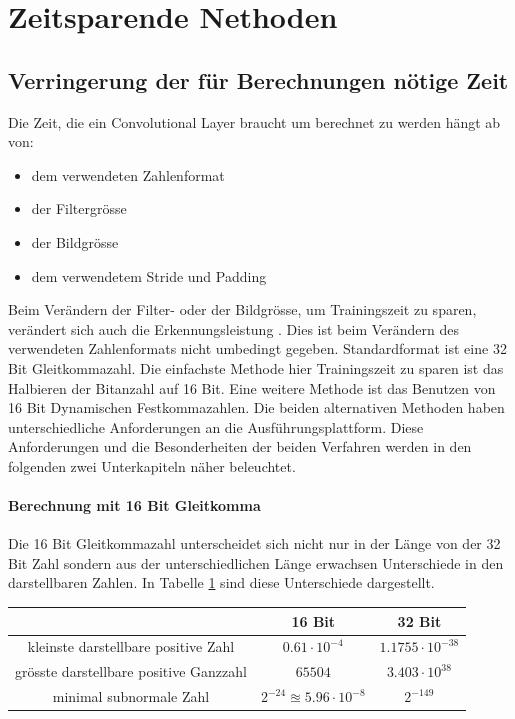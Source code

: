 \section{Zeitsparende Nethoden}

\subsection{Verringerung der für Berechnungen nötige Zeit}\label{sec:fp16}




Die Zeit, die ein Convolutional Layer braucht um berechnet zu werden hängt ab von:
\begin{itemize}
 \item dem verwendeten Zahlenformat
 \item der Filtergr\"osse
 \item der Bildgr\"osse
 \item dem verwendetem Stride und Padding
\end{itemize}



Beim Verändern der Filter- oder der Bildgr\"osse, um Trainingszeit zu sparen, ver\"andert sich auch die Erkennungsleistung . Dies ist beim Verändern des verwendeten Zahlenformats nicht umbedingt gegeben. Standardformat ist eine 32 Bit Gleitkommazahl. Die einfachste Methode hier Trainingszeit zu sparen ist das Halbieren der Bitanzahl auf 16 Bit. Eine weitere Methode ist das Benutzen von 16 Bit Dynamischen Festkommazahlen.
Die beiden alternativen Methoden haben unterschiedliche Anforderungen an die Ausführungsplattform. Diese Anforderungen und die Besonderheiten der beiden Verfahren werden in den folgenden zwei Unterkapiteln näher beleuchtet.


\paragraph{Berechnung mit 16 Bit Gleitkomma}
\cite{ieee}
Die 16 Bit Gleitkommazahl unterscheidet sich nicht nur in der Länge von der 32 Bit Zahl sondern aus der unterschiedlichen Länge erwachsen Unterschiede in den darstellbaren Zahlen. In Tabelle \ref{tab:numbers} sind diese Unterschiede dargestellt. 

\begin{table}[H]
\label{tab:numbers}
\begin{tabular}{|c|c|c|}
\hline                                       & 16 Bit                             & 32 Bit              \\ \hline
kleinste darstellbare positive Zahl    & $0.61  \cdot 10^{-4}$              & $1.1755 \cdot 10^{-38}$ \\ \hline
grösste darstellbare positive Ganzzahl & $65504$                            & $ 3.403 \cdot 10^{38}$  \\ \hline
minimal subnormale Zahl                & $2^{-24} \approxeq 5.96 \cdot 10^{-8}$ & $ 2^{-149}$         \\ \hline
\end{tabular}
\end{table}

